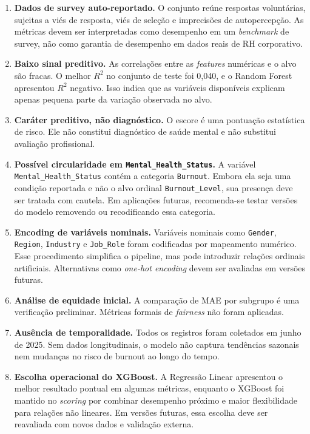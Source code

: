 \documentclass[conference]{IEEEtran}
\begin{document}
\begin{enumerate}
\item \textbf{Dados de survey auto-reportado.} O conjunto reúne respostas
voluntárias, sujeitas a viés de resposta, viés de seleção e
imprecisões de autopercepção. As métricas devem ser interpretadas
como desempenho em um \textit{benchmark} de survey, não como
garantia de desempenho em dados reais de RH corporativo.

\item \textbf{Baixo sinal preditivo.} As correlações entre as
      \textit{features} numéricas e o alvo são fracas. O melhor $R^2$ no
      conjunto de teste foi 0,040, e o Random Forest apresentou $R^2$
      negativo. Isso indica que as variáveis disponíveis explicam apenas
      pequena parte da variação observada no alvo.

\item \textbf{Caráter preditivo, não diagnóstico.} O escore é uma
      pontuação estatística de risco. Ele não constitui diagnóstico de
      saúde mental e não substitui avaliação profissional.

\item \textbf{Possível circularidade em \texttt{Mental\_Health\_Status}.}
      A variável \texttt{Mental\_Health\_Status} contém a categoria
      \texttt{Burnout}. Embora ela seja uma condição reportada e não o
      alvo ordinal \texttt{Burnout\_Level}, sua presença deve ser tratada
      com cautela. Em aplicações futuras, recomenda-se testar versões do
      modelo removendo ou recodificando essa categoria.

\item \textbf{Encoding de variáveis nominais.} Variáveis nominais como
      \texttt{Gender}, \texttt{Region}, \texttt{Industry} e
      \texttt{Job\_Role} foram codificadas por mapeamento numérico. Esse
      procedimento simplifica o pipeline, mas pode introduzir relações
      ordinais artificiais. Alternativas como \textit{one-hot encoding}
      devem ser avaliadas em versões futuras.

\item \textbf{Análise de equidade inicial.} A comparação de MAE por
      subgrupo é uma verificação preliminar. Métricas formais de
      \textit{fairness} não foram aplicadas.

\item \textbf{Ausência de temporalidade.} Todos os registros foram
      coletados em junho de 2025. Sem dados longitudinais, o modelo não
      captura tendências sazonais nem mudanças no risco de burnout ao
      longo do tempo.

\item \textbf{Escolha operacional do XGBoost.} A Regressão Linear apresentou
      o melhor resultado pontual em algumas métricas, enquanto o XGBoost foi
      mantido no \textit{scoring} por combinar desempenho próximo e maior
      flexibilidade para relações não lineares. Em versões futuras, essa
      escolha deve ser reavaliada com novos dados e validação externa.

\end{enumerate}
\end{document}
